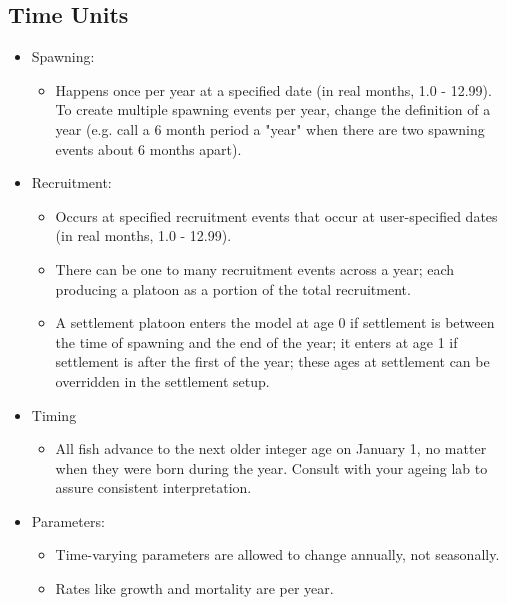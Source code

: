 \hypertarget{RecrTiming}{}
\subsection{Time Units}
	\begin{itemize}
		\item Spawning: 
		\begin{itemize}
			\item Happens once per year at a specified date (in real months, 1.0 - 12.99). To create multiple spawning events per year, change the definition of a year (e.g. call a 6 month period a "year" when there are two spawning events about 6 months apart). 
		\end{itemize}
		
		\item Recruitment:   
		\begin{itemize}
			\item Occurs at specified recruitment events that occur at user-specified dates (in real months, 1.0 - 12.99).
			\item There can be one to many recruitment events across a year; each producing a platoon as a portion of the total recruitment.
			\item A settlement platoon enters the model at age 0 if settlement is between the time of spawning and the end of the year; it enters at age 1 if settlement is after the first of the year; these ages at settlement can be overridden in the settlement setup.
		\end{itemize}
		
		\item Timing
		\begin{itemize}
			\item All fish advance to the next older integer age on January 1, no matter when they were born during the year.  Consult with your ageing lab to assure consistent interpretation.
		\end{itemize}		

		\item Parameters:
		\begin{itemize}
			\item Time-varying parameters are allowed to change annually, not seasonally.
			\item Rates like growth and mortality are per year.
		\end{itemize}
	\end{itemize}
	
